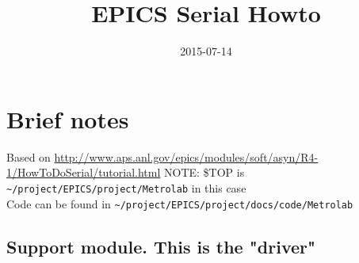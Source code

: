 \documentclass[11pt]{article}
\date{2015-07-14}
\title{EPICS Serial Howto}
\begin{document}
\maketitle

\section{Brief notes}
\label{sec-1}
Based on \url{http://www.aps.anl.gov/epics/modules/soft/asyn/R4-1/HowToDoSerial/tutorial.html}
NOTE: \$TOP is \verb,~/project/EPICS/project/Metrolab, in this case\\
  Code can be found in \verb,~/project/EPICS/project/docs/code/Metrolab,

\subsection{Support module. This is the "driver"}
\label{sec-1-1}
\end{document}
